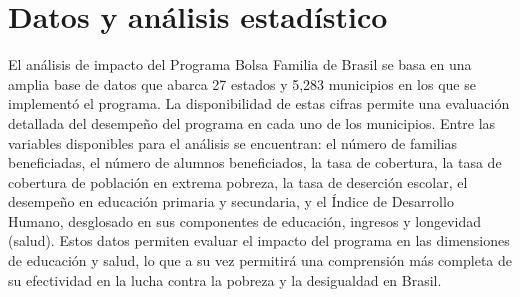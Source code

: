 \documentclass[
]{article}
\begin{document}
\newpage

\hypertarget{datos-y-anuxe1lisis-estaduxedstico}{%
\section{Datos y análisis
estadístico}\label{datos-y-anuxe1lisis-estaduxedstico}}

El análisis de impacto del Programa Bolsa Familia de Brasil se basa en
una amplia base de datos que abarca 27 estados y 5,283 municipios en los
que se implementó el programa. La disponibilidad de estas cifras permite
una evaluación detallada del desempeño del programa en cada uno de los
municipios. Entre las variables disponibles para el análisis se
encuentran: el número de familias beneficiadas, el número de alumnos
beneficiados, la tasa de cobertura, la tasa de cobertura de población en
extrema pobreza, la tasa de deserción escolar, el desempeño en educación
primaria y secundaria, y el Índice de Desarrollo Humano, desglosado en
sus componentes de educación, ingresos y longevidad (salud). Estos datos
permiten evaluar el impacto del programa en las dimensiones de educación
y salud, lo que a su vez permitirá una comprensión más completa de su
efectividad en la lucha contra la pobreza y la desigualdad en Brasil.
\end{document}
